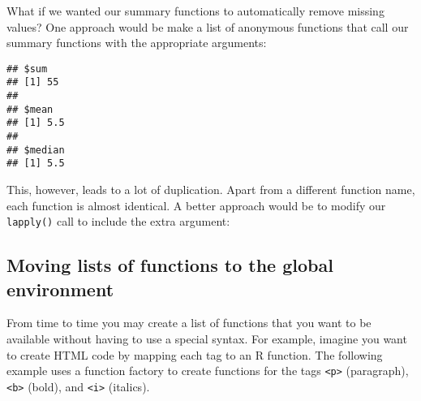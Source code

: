 What if we wanted our summary functions to automatically remove missing
values? One approach would be make a list of anonymous functions that
call our summary functions with the appropriate arguments:

\begin{Shaded}
\begin{Highlighting}[]
\StringTok{ }\NormalTok{(}
    \NormalTok{),}
    \NormalTok{),}
    \NormalTok{)}
\NormalTok{)}
\end{Highlighting}
\end{Shaded}

\begin{verbatim}
## $sum
## [1] 55
## 
## $mean
## [1] 5.5
## 
## $median
## [1] 5.5
\end{verbatim}

This, however, leads to a lot of duplication. Apart from a different
function name, each function is almost identical. A better approach
would be to modify our \texttt{lapply()} call to include the extra
argument:

\begin{Shaded}
\begin{Highlighting}[]
 \NormalTok{))}
\end{Highlighting}
\end{Shaded}

\hypertarget{moving-lists-of-functions-to-the-global-environment}{%
\subsection{Moving lists of functions to the global
environment}\label{moving-lists-of-functions-to-the-global-environment}}

From time to time you may create a list of functions that you want to be
available without having to use a special syntax. For example, imagine
you want to create HTML code by mapping each tag to an R function. The
following example uses a function factory to create functions for the
tags \texttt{\textless{}p\textgreater{}} (paragraph),
\texttt{\textless{}b\textgreater{}} (bold), and
\texttt{\textless{}i\textgreater{}} (italics).


